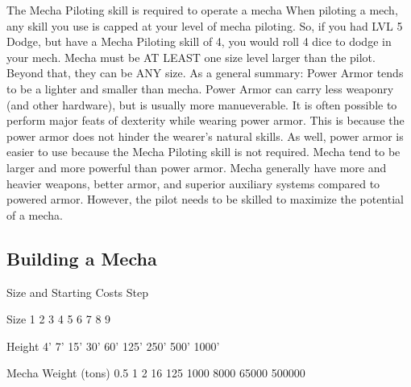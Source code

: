\documentclass[twoside]{book}
\begin{document}
               The Mecha Piloting skill is required to operate a
               mecha 
               When piloting a mech, any skill you use is capped at
               your level of mecha piloting. So, if you had LVL 5 Dodge,
               but have a Mecha Piloting skill of 4, you would roll 4
               dice to dodge in your mech. 
               Mecha must be AT LEAST one size level larger than
               the pilot. Beyond that, they can be ANY size. 
            As a general summary: Power Armor tends to be a
             lighter and smaller than mecha. Power Armor can carry less
             weaponry (and other hardware), but is usually more
             manueverable. It is often possible to perform major feats of
             dexterity while wearing power armor. This is because the
             power armor does not hinder the wearer’s natural
             skills. As well, power armor is easier to use because the
             Mecha Piloting skill is not required.   Mecha tend to be larger and more powerful than power
             armor. Mecha generally have more and heavier weapons, better
             armor, and superior auxiliary systems compared to powered
             armor. However, the pilot needs to be skilled to maximize
             the potential of a mecha. 
\subsection{Building a Mecha}
      
                
                Size and Starting Costs Step  
                  
                    
                      
                       Size   
                       1 
                       2 
                       3   
                       4 
                       5 
                       6   
                       7 
                       8 
                       9   
                      
                      
                       Height   
                       4'   
                       7'   
                       15'   
                       30'   
                       60'   
                       125'   
                       250'   
                       500'   
                       1000'   
                      
                      
                       Mecha Weight (tons)   
                       0.5   
                       1   
                       2   
                       16   
                       125   
                       1000   
                       8000   
                       65000   
                       500000   
                      
\end{document}
